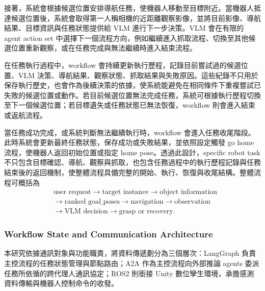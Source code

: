 \documentclass[12pt,a4paper]{article}
\begin{document}
接著，系統會根據候選位置安排導航任務，使機器人移動至目標附近。當機器人抵達候選位置後，系統會取得第一人稱相機的近距離觀察影像，並將目前影像、導航結果、目標資訊與任務狀態提供給 VLM 進行下一步決策。VLM 會在有限的 agent action set 中選擇下一個流程方向，例如繼續進入抓取流程、切換至其他候選位置重新觀察，或在任務完成與無法繼續時進入結束流程。

在任務執行過程中，workflow 會持續更新執行歷程，記錄目前嘗試過的候選位置、VLM 決策、導航結果、觀察狀態、抓取結果與失敗原因。這些紀錄不只用於保存執行歷史，也會作為後續決策的依據，使系統能避免在相同條件下重複嘗試已失敗的候選位置或動作。若目前候選位置無法完成任務，系統可根據執行歷程切換至下一個候選位置；若目標遺失或任務狀態已無法恢復，workflow 則會進入結束或返航流程。

當任務成功完成，或系統判斷無法繼續執行時，workflow 會進入任務收尾階段。此時系統會更新最終任務狀態，保存成功或失敗結果，並依照設定觸發 go home 流程，使機器人返回初始位置或指定 home pose。透過此設計，specific robot task 不只包含目標確認、導航、觀察與抓取，也包含任務過程中的執行歷程記錄與任務結束後的返回機制，使整體流程具備完整的開始、執行、恢復與收尾結構。整體流程可概括為
\begin{equation}
\begin{aligned}
    &\text{user request}
    \rightarrow \text{target instance}
    \rightarrow \text{object information} \\
    &\rightarrow \text{ranked goal\_poses}
    \rightarrow \text{navigation}
    \rightarrow \text{observation} \\
    &\rightarrow \text{VLM decision}
    \rightarrow \text{grasp or recovery}.
\end{aligned}
\end{equation}

\subsubsection{Workflow State and Communication Architecture}

本研究依據通訊對象與功能職責，將資料傳遞劃分為三個層次：LangGraph 負責主控流程的任務狀態管理與節點路由；A2A 作為主控流程向外部推論 agents 委派任務所依循的跨代理人通訊協定；ROS2 則銜接 Unity 數位孿生環境，承擔感測資料傳輸與機器人控制命令的收發。
\end{document}
